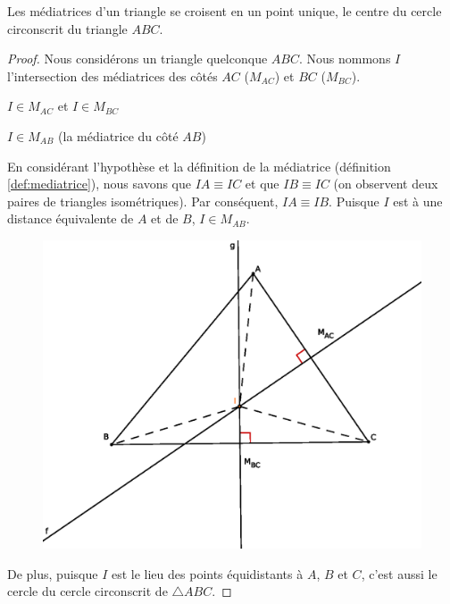 \documentclass[a4paper,12pt]{article}
\begin{document}
\begin{corollary} \label{cor:mediatrices}
Les médiatrices d'un triangle se croisent en un point unique, le centre du cercle circonscrit du triangle $ABC$.
\end{corollary}
\begin{proof}
Nous considérons un triangle quelconque $ABC$. Nous nommons $I$ l'intersection des médiatrices des côtés $AC$ ($M_{AC}$) et $BC$ ($M_{BC}$).

\begin{hyp}
$I \in M_{AC}$ et $I \in M_{BC}$
\end{hyp}
\begin{concl}
$I \in M_{AB}$ (la médiatrice du côté $AB$) 
\end{concl}

En considérant l'hypothèse et la définition de la médiatrice (définition \ref{def:mediatrice}), nous savons que $IA \equiv IC$ et que $IB \equiv IC$ (on observent deux paires de triangles isométriques). Par conséquent, $IA \equiv IB$. Puisque $I$ est à une distance équivalente de $A$ et de $B$, $I \in M_{AB}$.\\
\begin{figure}[H]
        \centering
        \includegraphics[scale=1]{corMediatrice.eps}
    \end{figure}

De plus, puisque $I$ est le lieu des points équidistants à $A$, $B$ et $C$, c'est aussi le cercle du cercle circonscrit de $\triangle ABC$.
\end{proof}
\end{document}
